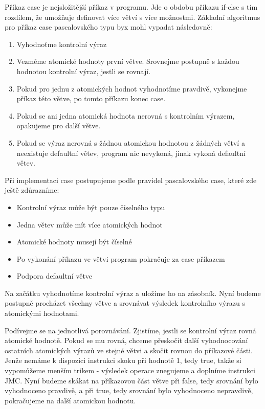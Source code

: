 \documentclass[
12pt,
a4paper,
pdftex,
czech,
titlepage
]{report}
\begin{document}
Příkaz case je nejsložitější příkaz v programu. Jde o obdobu příkazu if-else s tím rozdílem, že umožňuje definovat více větví s více možnostmi. Základní algoritmus pro příkaz case pascalovského typu byx mohl vypadat následovně:
\begin{enumerate}
\item Vyhodnoťme kontrolní výraz
\item Vezměme atomické hodnoty první větve. Srovnejme postupně s každou hodnotou kontrolní výraz, jestli se rovnají.
\item Pokud pro jednu z atomických hodnot vyhodnotíme pravdivě, vykonejme příkaz této větve, po tomto příkazu konec case. 
\item Pokud se ani jedna atomická hodnota nerovná s kontrolním výrazem, opakujeme pro další větve.
\item Pokud se výraz nerovná s žádnou atomickou hodnotou z žádných větví a neexistuje defaultní větev, program nic nevykoná, jinak vykoná defaultní větev.
\end{enumerate}

Při implementaci case postupujeme podle pravidel pascalovského case, které zde ještě zdůrazníme:
\begin{itemize}
\item Kontrolní výraz může být pouze číselného typu
\item Jedna větev může mít více atomických hodnot
\item Atomické hodnoty musejí být číselné
\item Po vykonání příkazu ve větvi program pokračuje za case příkazem
\item Podpora defaultní větve
\end{itemize}

Na začátku vyhodnotíme kontrolní výraz a uložíme ho na zásobník. Nyní budeme postupně procházet všechny větve a srovnávat výsledek kontrolního výrazu s atomickými hodnotami. 

Podívejme se na jednotlivá porovnávání. Zjistíme, jestli se kontrolní výraz rovná atomické hodnotě. Pokud se mu rovná, chceme přeskočit další vyhodnocování ostatních atomických výrazů ve stejné větvi a skočit rovnou do příkazové části. Jenže nemáme k dispozici instrukci skoku při hodnotě 1, tedy true, takže si vypomůžeme menším trikem - výsledek operace znegujeme a doplníme instrukci JMC. Nyní budeme skákat na příkazovou část větve při false, tedy srovnání bylo vyhodnoceno pravdivě, a při true, tedy srovnání bylo vyhodnoceno nepravdivě, pokračujeme na další atomickou hodnotu. 
\end{document}
